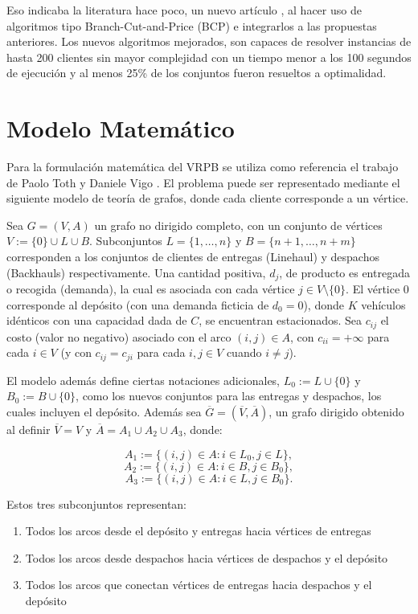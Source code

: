\documentclass[letter, 10pt]{article}
\begin{document}
Eso indicaba la literatura hace poco, un nuevo artículo \cite{queiroga2020exact}, al hacer uso de algoritmos tipo Branch-Cut-and-Price (BCP) e integrarlos a las propuestas anteriores. Los nuevos algoritmos mejorados, son capaces de resolver instancias de hasta 200 clientes sin mayor complejidad con un tiempo menor a los 100 segundos de ejecución y al menos 25\% de los conjuntos fueron resueltos a optimalidad.

\section{Modelo Matemático}
Para la formulación matemática del VRPB se utiliza como referencia el trabajo de Paolo Toth y Daniele Vigo \cite{toth2002vehicle}. El problema puede ser representado mediante el siguiente modelo de teoría de grafos, donde cada cliente corresponde a un vértice.

Sea $G = (V, A)$ un grafo no dirigido completo, con un conjunto de vértices $V := \{0\} \cup L \cup B$. Subconjuntos $L = \{1,\dots,n\}$ y $B = \{n+1,\dots,n+m\}$ corresponden a los conjuntos de clientes de entregas (Linehaul) y despachos (Backhauls) respectivamente. Una cantidad positiva, $d_j$, de producto es entregada o recogida (demanda), la cual es asociada con cada vértice $j \in V \setminus \{0\}$. El vértice $0$ corresponde al depósito (con una demanda ficticia de $d_0=0$), donde $K$ vehículos idénticos con una capacidad dada de $C$, se encuentran estacionados. Sea $c_{ij}$ el costo (valor no negativo) asociado con el arco $(i,j) \in A$, con $c_{ii} = +\infty$ para cada $i \in V$ (y con $c_{ij} = c_{ji}$ para cada $i, j \in V$ cuando $i \neq j$).

El modelo además define ciertas notaciones adicionales, $L_0 := L \cup \{0\}$ y $B_0 := B \cup \{0\}$, como los nuevos conjuntos para las entregas y despachos, los cuales incluyen el depósito. Además sea $\overline{G}=(\overline{V}, \overline{A})$, un grafo dirigido obtenido al definir $\overline{V} = V$ y $\overline{A} = A_1 \cup A_2 \cup A_3$, donde:

$$A_1 := \{(i, j) \in A : i \in L_0, j \in L\},$$
$$A_2 := \{(i, j) \in A : i \in B, j \in B_0\},$$
$$A_3 := \{(i, j) \in A : i \in L, j \in B_0\}.$$

Estos tres subconjuntos representan:
\begin{enumerate}
    \item Todos los arcos desde el depósito y entregas hacia vértices de entregas
    \item Todos los arcos desde despachos hacia vértices de despachos y el depósito
    \item Todos los arcos que conectan vértices de entregas hacia despachos y el depósito
\end{enumerate}
\end{document}

